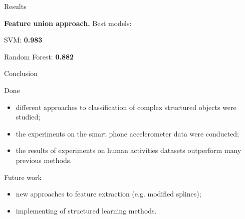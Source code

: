 \documentclass{beamer}
\begin{document}
\begin{frame}{Results}
\begin{minipage}[t]{0.49\columnwidth}
\begin{figure}[h]
		\end{figure}
	\end{minipage}
	\vfill
	\textbf{Feature union approach.} Best models: \\
	\vspace{-0.3cm}
	\hspace{1cm}\begin{minipage}[t]{0.39\columnwidth}
		\begin{block}{}
			\centering
			SVM: \textbf{\Large 0.983} 
		\end{block}
	\end{minipage}
	\hspace{1cm}
	\begin{minipage}[t]{0.39\columnwidth}
		\begin{block}{}
			\centering
			Random Forest: \textbf{\Large 0.882}
		\end{block}
	\end{minipage}
	
\end{frame}
\begin{frame}{Conclusion}
	\begin{block}{Done}
		\begin{itemize}
			\item different approaches to classification of complex structured objects were studied;
			\item the experiments on the smart phone accelerometer data were conducted;
			\item the results of experiments on human activities datasets outperform many previous methods.
		\end{itemize}
	\end{block}
	\vfill
	\begin{block}{Future work}
		\begin{itemize}
			\item new approaches to feature extraction (e.g. modified splines);
			\item implementing of structured learning methods.
		\end{itemize}
	
	\end{block}
\end{frame}
\end{document}
